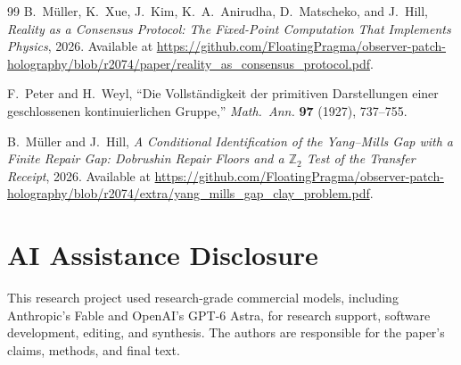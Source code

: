 \documentclass[11pt]{article}
\begin{document}
\begin{thebibliography}{99}
B.~M\"uller, K.~Xue, J.~Kim, K.~A.~Anirudha, D.~Matscheko, and J.~Hill,
\emph{Reality as a Consensus Protocol: The Fixed-Point Computation That Implements Physics},
2026.
Available at \url{https://github.com/FloatingPragma/observer-patch-holography/blob/r2074/paper/reality_as_consensus_protocol.pdf}.

F.~Peter and H.~Weyl,
``Die Vollst\"andigkeit der primitiven Darstellungen einer geschlossenen kontinuierlichen Gruppe,''
\emph{Math.\ Ann.} \textbf{97} (1927), 737--755.

B.~M\"uller and J.~Hill,
\emph{A Conditional Identification of the Yang--Mills Gap with a Finite Repair Gap: Dobrushin Repair Floors and a \(\mathbb Z_2\) Test of the Transfer Receipt},
2026.
Available at \url{https://github.com/FloatingPragma/observer-patch-holography/blob/r2074/extra/yang_mills_gap_clay_problem.pdf}.

\end{thebibliography}

\section*{AI Assistance Disclosure}
This research project used research-grade commercial models, including
Anthropic's Fable and OpenAI's GPT-6 Astra, for research support, software
development, editing, and synthesis. The authors are responsible for the
paper's claims, methods, and final text.
\end{document}
